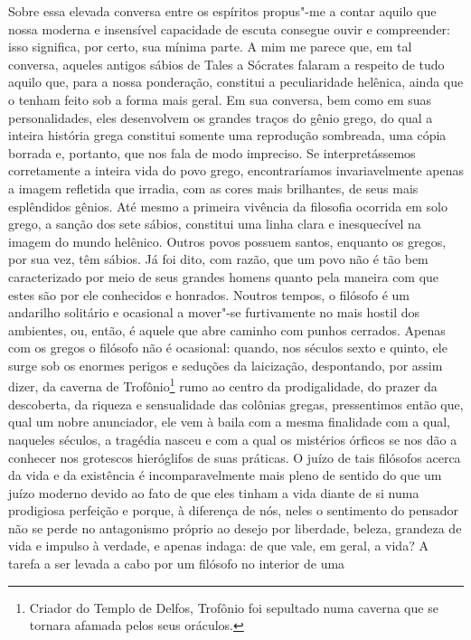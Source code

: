 Sobre essa elevada conversa entre os espíritos propus"-me a contar aquilo que
nossa moderna e insensível capacidade de escuta consegue ouvir e compreender:
isso significa, por certo, sua mínima parte. A mim me parece que, em tal
conversa, aqueles antigos sábios de Tales a Sócrates falaram a respeito de
tudo aquilo que, para a nossa ponderação, constitui a peculiaridade helênica,
ainda que o tenham feito sob a forma mais geral. Em sua conversa, bem como em
suas personalidades, eles desenvolvem os grandes traços do gênio grego, do
qual a inteira história grega constitui somente uma reprodução sombreada, uma
cópia borrada e, portanto, que nos fala de modo impreciso. Se interpretássemos 
corretamente a inteira vida do povo grego, encontraríamos
invariavelmente apenas a imagem refletida que irradia, com as cores mais
brilhantes, de seus mais esplêndidos gênios. Até mesmo a primeira vivência da
filosofia ocorrida em solo grego, a sanção dos sete sábios, constitui uma
linha clara e inesquecível na imagem do mundo helênico. Outros povos possuem
santos, enquanto os \label{santos} gregos, por sua vez, têm sábios. Já foi
dito, com razão, que um povo não é tão bem caracterizado por meio de seus
grandes homens quanto pela maneira com que estes são por ele conhecidos e
honrados. Noutros tempos, o filósofo é um andarilho solitário e ocasional a
mover"-se furtivamente no mais hostil dos ambientes, ou, então, é aquele que
abre caminho com punhos cerrados. Apenas com os gregos o filósofo não é
ocasional: quando, nos séculos sexto e quinto, ele surge sob os enormes
perigos e seduções da laicização, despontando, por assim dizer, da caverna de
Trofônio\footnote{Criador do Templo de Delfos, Trofônio foi sepultado numa
caverna que se tornara afamada pelos seus oráculos.} rumo ao centro da
prodigalidade, do prazer da descoberta, da riqueza e sensualidade das
colônias gregas, pressentimos então que, qual um nobre anunciador, ele vem à
baila com a mesma finalidade com a qual, naqueles séculos, a tragédia nasceu
e com a qual os mistérios órficos se nos dão a conhecer nos grotescos
hieróglifos de suas práticas. O juízo de tais filósofos acerca da vida e da
existência é incomparavelmente mais pleno de sentido do que um juízo moderno
devido ao fato de que eles tinham a vida diante de si numa prodigiosa
perfeição e porque, à diferença de nós, neles o sentimento do pensador não se
perde no antagonismo próprio ao desejo por liberdade, beleza, grandeza de
vida e impulso à verdade, e apenas indaga: de que vale, em geral, a vida? A
tarefa a ser levada a cabo por um filósofo no interior de uma \label{tarefaaserlevada} 
